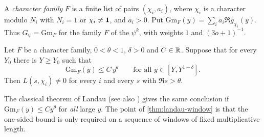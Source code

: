 A \emph{character family} $F$ is a finite list of pairs $(\chi_i,a_i)$, where $\chi_i$ is a character
modulo $N_i$ with $N_i=1$ or $\chi_i\ne\mathbf{1}$, and $a_i>0$. Put
$\mathrm{Gm}_F(y)=\sum_ia_i\Re g_{\chi_i}(y)$. Thus $G_\psi=\mathrm{Gm}_F$ for the family $F$ of the
$\psi^k$, with weights $1$ and $(3o+1)^{-1}$.

\begin{theorem}\label{thm:landau-window}
Let $F$ be a character family, $0<\theta<1$, $\delta>0$ and $C\in\mathbb{R}$. Suppose that for every $Y_0$
there is $Y\ge Y_0$ such that
\[
\mathrm{Gm}_F(y)\le C\,y^\theta\qquad\text{for all }y\in[Y,Y^{1+\delta}].
\]
Then $L(s,\chi_i)\ne0$ for every $i$ and every $s$ with $\Re s>\theta$.
 
\end{theorem}

The classical theorem of Landau \cite{Landau1905} (see also \cite{Ingham1932}) gives the same
conclusion if $\mathrm{Gm}_F(y)\le Cy^\theta$ for \emph{all} large $y$. The point of
\cref{thm:landau-window} is that the one-sided bound is only required on a sequence of windows of
fixed multiplicative length.


